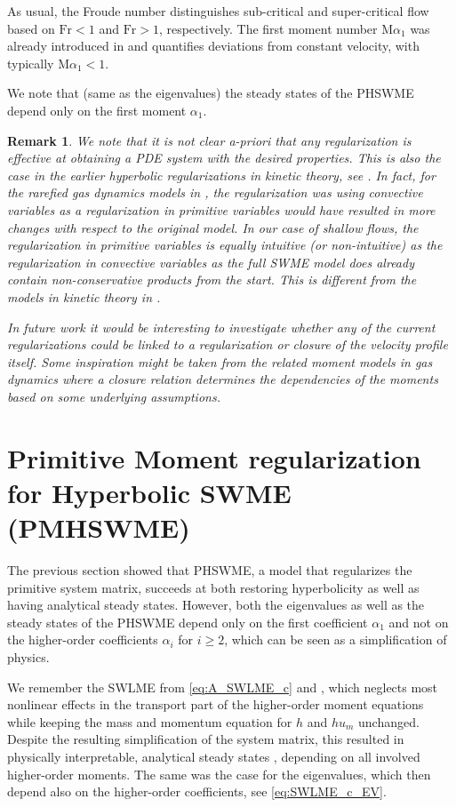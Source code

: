 \documentclass[a4paper, 11pt]{article}
\newtheorem{remark}{Remark}
\newcommand{\Fr}{\textrm{Fr}} %
\newcommand{\Ma}{\textrm{M}\alpha} %
\begin{document}
As usual, the Froude number distinguishes sub-critical and super-critical flow based on $\Fr<1$ and $\Fr>1$, respectively. The first moment number $\Ma_1$ was already introduced in \cite{Koellermeier2020i} and quantifies deviations from constant velocity, with typically $\Ma_1 < 1$.

We note that (same as the eigenvalues) the steady states of the PHSWME depend only on the first moment $\alpha_1$.


\begin{remark}
    We note that it is not clear a-priori that any regularization is effective at obtaining a PDE system with the desired properties. This is also the case in the earlier hyperbolic regularizations in kinetic theory, see \cite{Cai2013b,Koellermeier2015}. In fact, for the rarefied gas dynamics models in \cite{Cai2013b}, the regularization was using convective variables as a regularization in primitive variables would have resulted in more changes with respect to the original model.
    In our case of shallow flows, the regularization in primitive variables is equally intuitive (or non-intuitive) as the regularization in convective variables as the full SWME model does already contain non-conservative products from the start. This is different from the models in kinetic theory in \cite{Cai2013b}.

    In future work it would be interesting to investigate whether any of the current regularizations could be linked to a regularization or closure of the velocity profile itself. Some inspiration might be taken from the related moment models in gas dynamics \cite{McDonald2013,Schaerer2015} where a closure relation determines the dependencies of the moments based on some underlying assumptions.
\end{remark}

\section{Primitive Moment regularization for Hyperbolic SWME (PMHSWME)}
\label{sec:new_new_hyp}
The previous section showed that PHSWME, a model that regularizes the primitive system matrix, succeeds at both restoring hyperbolicity as well as having analytical steady states.
However, both the eigenvalues as well as the steady states of the PHSWME depend only on the first coefficient $\alpha_1$ and not on the higher-order coefficients $\alpha_i$ for $i\geq2$, which can be seen as a simplification of physics.

We remember the SWLME from \eqref{eq:A_SWLME_c} and \cite{Koellermeier2020i}, which neglects most nonlinear effects in the transport part of the higher-order moment equations while keeping the mass and momentum equation for $h$ and $h u_m$ unchanged. Despite the resulting simplification of the system matrix, this resulted in physically interpretable, analytical steady states \cite{Koellermeier2020i}, depending on all involved higher-order moments. The same was the case for the eigenvalues, which then depend also on the higher-order coefficients, see \eqref{eq:SWLME_c_EV}.
\end{document}
